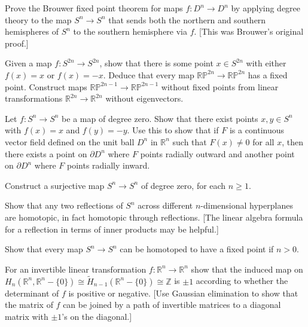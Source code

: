\begin{exercise}
Prove the Brouwer fixed point theorem for maps $f:D^n \to D^n$ by applying degree theory to the map $S^n \to S^n$ that sends both the northern and southern hemispheres of $S^n$ to the southern hemisphere via $f$. [This was Brouwer's original proof.]
\end{exercise}

\begin{exercise}
Given a map $f:S^{2n} \to S^{2n}$, show that there is some point $x \in S^{2n}$ with either $f(x) = x$ or $f(x) = -x$. Deduce that every map $\mathbb{RP}^{2n} \to \mathbb{RP}^{2n}$ has a fixed point. Construct maps $\mathbb{RP}^{2n-1} \to \mathbb{RP}^{2n-1}$ without fixed points from linear transformations $\mathbb{R}^{2n} \to \mathbb{R}^{2n}$ without eigenvectors.
\end{exercise}

\begin{exercise}
Let $f:S^n \to S^n$ be a map of degree zero. Show that there exist points $x,y \in S^n$ with $f(x) = x$ and $f(y) = -y$. Use this to show that if $F$ is a continuous vector field defined on the unit ball $D^n$ in $\mathbb{R}^n$ such that $F(x) \neq 0$ for all $x$, then there exists a point on $\partial D^n$ where $F$ points radially outward and another point on $\partial D^n$ where $F$ points radially inward.
\end{exercise}

\begin{exercise}
Construct a surjective map $S^n \to S^n$ of degree zero, for each $n \geq 1$.
\end{exercise}

\begin{exercise}
Show that any two reflections of $S^n$ across different $n$-dimensional hyperplanes are homotopic, in fact homotopic through reflections. [The linear algebra formula for a reflection in terms of inner products may be helpful.]
\end{exercise}

\begin{exercise}
Show that every map $S^n \to S^n$ can be homotoped to have a fixed point if $n > 0$.
\end{exercise}

\begin{exercise}
For an invertible linear transformation $f:\mathbb{R}^n \to \mathbb{R}^n$ show that the induced map on $H_n(\mathbb{R}^n, \mathbb{R}^n - \{0\}) \cong \widetilde{H}_{n-1}(\mathbb{R}^n - \{0\}) \cong \mathbb{Z}$ is $\pm 1$ according to whether the determinant of $f$ is positive or negative. [Use Gaussian elimination to show that the matrix of $f$ can be joined by a path of invertible matrices to a diagonal matrix with $\pm 1$'s on the diagonal.]
\end{exercise}


